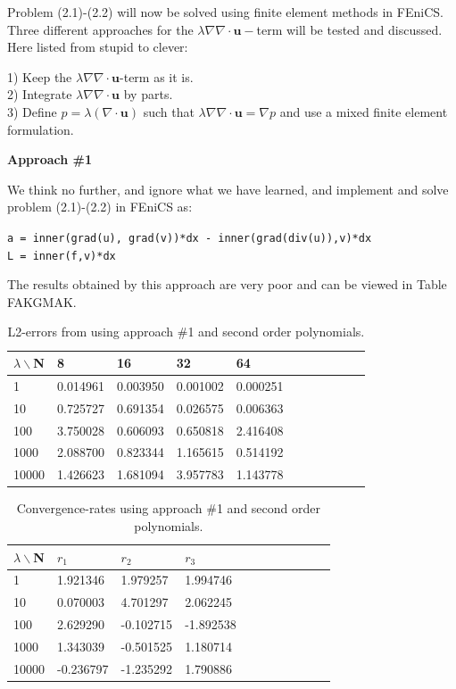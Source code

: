 \documentclass[11pt,a4paper,english]{article}
\numberwithin{equation}{section}
\begin{document}
Problem (2.1)-(2.2) will now be solved using finite element methods in FEniCS. Three different approaches for the $\lambda \nabla \nabla \cdot \mathbf{u}-$term will be tested and discussed. Here listed from stupid to clever:

1) Keep the $\lambda \nabla \nabla \cdot \mathbf{u}$-term as it is. \\
2) Integrate $\lambda \nabla \nabla \cdot \mathbf{u}$ by parts. \\
3) Define $p=\lambda(\nabla \cdot \mathbf{u})$ such that $\lambda \nabla \nabla \cdot \mathbf{u} = \nabla p$ and use a mixed finite element formulation. 

\textbf{Approach \#1}

We think no further, and ignore what we have learned, and implement and solve problem (2.1)-(2.2) in FEniCS as:

\begin{framed}
\texttt{a = inner(grad(u), grad(v))*dx - inner(grad(div(u)),v)*dx \\
L = inner(f,v)*dx}  
\end{framed} 

The results obtained by this approach are very poor and can be viewed in Table FAKGMAK. 

\begin{table}[H]
\centering
\caption{ L2-errors from using approach \#1 and second order polynomials.}
\vspace{3mm}
\begin{tabular}{|l|l|l|l|l|l|l|l|l|l|l|}
\hline
$\lambda\backslash$N & 8 & 16 & 32 & 64 \\
\hline
1 & 0.014961 & 0.003950 & 0.001002 & 0.000251 \\
\hline
10 & 0.725727 & 0.691354 & 0.026575 & 0.006363 \\
\hline
100 & 3.750028 & 0.606093 & 0.650818 & 2.416408 \\
\hline
1000 & 2.088700 & 0.823344 & 1.165615 & 0.514192 \\
\hline
10000 & 1.426623 & 1.681094 & 3.957783 & 1.143778 \\
\hline
\end{tabular}
\end{table}

\begin{table}[H]
\centering
\caption{ Convergence-rates using approach \#1 and second order polynomials. }
\vspace{3mm}
\begin{tabular}{|l|l|l|l|l|l|l|l|l|l|l|}
\hline
$\lambda \backslash$N & $r_1$ & $r_2$ & $r_3$ \\
\hline
1 & 1.921346 & 1.979257 & 1.994746 \\
\hline
10 & 0.070003 & 4.701297 & 2.062245 \\
\hline
100 & 2.629290 & -0.102715 & -1.892538 \\
\hline
1000 & 1.343039 & -0.501525 & 1.180714 \\
\hline
10000 & -0.236797 & -1.235292 & 1.790886 \\
\hline
\end{tabular}
\end{table}
\end{document}
